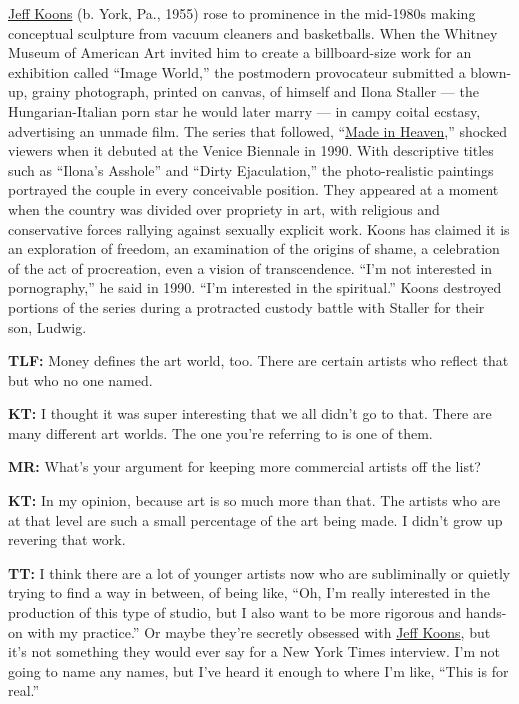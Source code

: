 \href{https://www.nytimes.com/topic/person/jeff-koons}{Jeff Koons} (b.
York, Pa., 1955) rose to prominence in the mid-1980s making conceptual
sculpture from vacuum cleaners and basketballs. When the Whitney Museum
of American Art invited him to create a billboard-size work for an
exhibition called ``Image World,'' the postmodern provocateur submitted
a blown-up, grainy photograph, printed on canvas, of himself and Ilona
Staller --- the Hungarian-Italian porn star he would later marry --- in
campy coital ecstasy, advertising an unmade film. The series that
followed, ``\href{http://www.jeffkoons.com/artwork/made-in-heaven}{Made
in Heaven},'' shocked viewers when it debuted at the Venice Biennale in
1990. With descriptive titles such as ``Ilona's Asshole'' and ``Dirty
Ejaculation,'' the photo-realistic paintings portrayed the couple in
every conceivable position. They appeared at a moment when the country
was divided over propriety in art, with religious and conservative
forces rallying against sexually explicit work. Koons has claimed it is
an exploration of freedom, an examination of the origins of shame, a
celebration of the act of procreation, even a vision of transcendence.
``I'm not interested in pornography,'' he said in 1990. ``I'm interested
in the spiritual.'' Koons destroyed portions of the series during a
protracted custody battle with Staller for their son, Ludwig.

\textbf{TLF:} Money defines the art world, too. There are certain
artists who reflect that but who no one named.

\textbf{KT:} I thought it was super interesting that we all didn't go to
that. There are many different art worlds. The one you're referring to
is one of them.

\textbf{MR:} What's your argument for keeping more commercial artists
off the list?

\textbf{KT:} In my opinion, because art is so much more than that. The
artists who are at that level are such a small percentage of the art
being made. I didn't grow up revering that work.

\textbf{TT:} I think there are a lot of younger artists now who are
subliminally or quietly trying to find a way in between, of being like,
``Oh, I'm really interested in the production of this type of studio,
but I also want to be more rigorous and hands-on with my practice.'' Or
maybe they're secretly obsessed with
\href{https://www.nytimes.com/2010/02/28/arts/design/28koons.html}{Jeff
Koons}, but it's not something they would ever say for a New York Times
interview. I'm not going to name any names, but I've heard it enough to
where I'm like, ``This is for real.''

